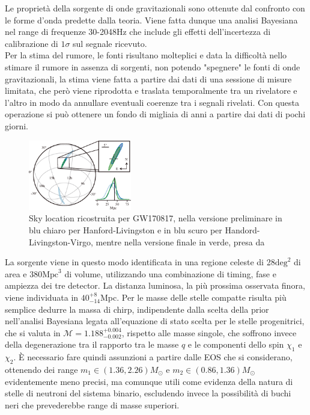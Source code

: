 Le proprietà della sorgente di onde gravitazionali sono ottenute dal confronto con le forme d'onda predette dalla teoria. Viene fatta dunque una analisi Bayesiana nel range di frequenze 30-2048Hz che include gli effetti dell'incertezza di calibrazione di $1\sigma$ sul segnale ricevuto.\\Per la stima del rumore, le fonti risultano molteplici e data la difficoltà nello stimare il rumore in assenza di sorgenti, non potendo "spegnere" le fonti di onde gravitazionali, la stima viene fatta a partire dai dati di una sessione di misure limitata, che però viene riprodotta e traslata temporalmente tra un rivelatore e l'altro in modo da annullare eventuali coerenze tra i segnali rivelati. Con questa operazione si può ottenere un fondo di migliaia di anni a partire dai dati di pochi giorni.\\
\begin{figure}
	\vspace{-35pt}
	\begin{center}
		\includegraphics[width=0.4\textwidth]{figures/Capitolo_2/skymap.png}
	\end{center}
	\vspace{-5pt}
	\caption{Sky location ricostruita per GW170817, nella versione preliminare in blu chiaro per Hanford-Livingston e in blu scuro per Handord-Livingston-Virgo, mentre nella versione finale in verde, presa da \cite{Abbott_2019}}
	\label{fig:skymap}
	\vspace{-20pt}
\end{figure}

La sorgente viene in questo modo identificata in una regione celeste di 28$\text{deg}^2$ di area e $380\text{Mpc}^3$ di volume, utilizzando una combinazione di timing, fase e ampiezza dei tre detector. La distanza luminosa, la più prossima osservata finora, viene individuata in $40_{-14}^{+8}$Mpc. Per le masse delle stelle compatte risulta più semplice dedurre la massa di chirp, indipendente dalla scelta della prior nell'analisi Bayesiana legata all'equazione di stato scelta per le stelle progenitrici, che si valuta in $\mathcal{M}=1.188_{-0.002}^{+0.004}$, rispetto alle masse singole, che soffrono invece della degenerazione tra il rapporto tra le masse $q$ e le componenti dello spin $\chi_1$ e $\chi_2$. È necessario fare quindi assunzioni a partire dalle EOS che si considerano, ottenendo dei range $m_1 \in (1.36, 2.26)M_\odot$ e $m_2 \in (0.86, 1.36)M_\odot$ evidentemente meno precisi, ma comunque utili come evidenza della natura di stelle di neutroni del sistema binario, escludendo invece la possibilità di buchi neri che prevederebbe range di masse superiori\cite{Abbott_2017a}.

